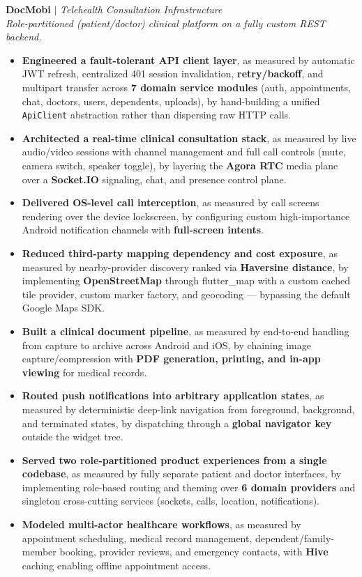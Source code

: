 \documentclass[10pt,letterpaper]{article}
\newenvironment{highlights}{
  \begin{itemize}[topsep=2pt,parsep=1pt,partopsep=0pt,itemsep=0pt,leftmargin=10pt]
}{\end{itemize}}
\begin{document}
\textbf{DocMobi} $|$ \textit{Telehealth Consultation Infrastructure}
\hfill
\href{https://play.google.com/store/apps/details?id=com.docmobi.app}{\textcolor{myblue}{\faGooglePlay}}
\href{https://apps.apple.com/fr/app/docmobi/id6760239548}{\textcolor{myblue}{\faAppStore}}
\href{https://github.com/H-Yeasin/AroggyaPath}{\textcolor{myblue}{\faGithub}}\\
\textit{Role-partitioned (patient/doctor) clinical platform on a fully custom REST backend.}
\begin{highlights}
  \item \textbf{Engineered a fault-tolerant API client layer}, as measured by automatic JWT refresh, centralized 401 session invalidation, \textbf{retry/backoff}, and multipart transfer across \textbf{7 domain service modules} (auth, appointments, chat, doctors, users, dependents, uploads), by hand-building a unified \texttt{ApiClient} abstraction rather than dispersing raw HTTP calls.
  \item \textbf{Architected a real-time clinical consultation stack}, as measured by live audio/video sessions with channel management and full call controls (mute, camera switch, speaker toggle), by layering the \textbf{Agora RTC} media plane over a \textbf{Socket.IO} signaling, chat, and presence control plane.
  \item \textbf{Delivered OS-level call interception}, as measured by call screens rendering over the device lockscreen, by configuring custom high-importance Android notification channels with \textbf{full-screen intents}.
  \item \textbf{Reduced third-party mapping dependency and cost exposure}, as measured by nearby-provider discovery ranked via \textbf{Haversine distance}, by implementing \textbf{OpenStreetMap} through flutter\_map with a custom cached tile provider, custom marker factory, and geocoding — bypassing the default Google Maps SDK.
  \item \textbf{Built a clinical document pipeline}, as measured by end-to-end handling from capture to archive across Android and iOS, by chaining image capture/compression with \textbf{PDF generation, printing, and in-app viewing} for medical records.
  \item \textbf{Routed push notifications into arbitrary application states}, as measured by deterministic deep-link navigation from foreground, background, and terminated states, by dispatching through a \textbf{global navigator key} outside the widget tree.
  \item \textbf{Served two role-partitioned product experiences from a single codebase}, as measured by fully separate patient and doctor interfaces, by implementing role-based routing and theming over \textbf{6 domain providers} and singleton cross-cutting services (sockets, calls, location, notifications).
  \item \textbf{Modeled multi-actor healthcare workflows}, as measured by appointment scheduling, medical record management, dependent/family-member booking, provider reviews, and emergency contacts, with \textbf{Hive} caching enabling offline appointment access.
\end{highlights}
\end{document}
